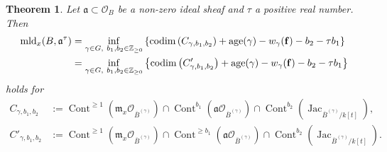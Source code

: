 \documentclass[a4paper,11pt]{amsart}
\newtheorem{thm}{Theorem}[section]
\theoremstyle{definition}
\theoremstyle{remark}
\begin{document}
\begin{thm}\label{thm:mld_hyperquot}
Let $\mathfrak{a} \subset  \mathcal{O}_B$ be a non-zero ideal sheaf and $\tau$ a positive real number. 
Then 
\begin{align*}
\operatorname{mld}_x(B,\mathfrak{a}^{\tau}) 
&= \inf _{\gamma \in G, \ b_1, b_2 \in \mathbb{Z}_{\ge 0}}
\left \{ 
\operatorname{codim} \left( C_{\gamma, b_1, b_2} \right) + \operatorname{age}(\gamma)- w_\gamma({\bf f}) - b_2 - \tau b_1
\right \} \\
&= \inf _{\gamma \in G, \ b_1, b_2 \in \mathbb{Z}_{\ge 0}}
\left \{ 
\operatorname{codim} \left( C' _{\gamma, b_1, b_2} \right) + \operatorname{age}(\gamma) - w_\gamma({\bf f}) - b_2 - \tau b_1
\right \}
\end{align*}
holds for 
\begin{align*}
C_{\gamma, b_1, b_2} 
& := 
\operatorname{Cont}^{\ge 1} \left( \mathfrak{m}_x \mathcal{O}_{\overline{B}^{(\gamma)}} \right) \cap
\operatorname{Cont}^{b_1}  \left( \mathfrak{a} \mathcal{O}_{\overline{B}^{(\gamma)}} \right) \cap  
\operatorname{Cont}^{b_2} \left(\operatorname{Jac}_{\overline{B}^{(\gamma)}/k[t]} \right), \\
C'_{\gamma, b_1, b_2}
& := 
\operatorname{Cont}^{\ge 1} \left(\mathfrak{m}_x \mathcal{O}_{\overline{B}^{(\gamma)}} \right) \cap
\operatorname{Cont}^{\ge b_1}  \left(\mathfrak{a} \mathcal{O}_{\overline{B}^{(\gamma)}} \right) \cap 
\operatorname{Cont}^{b_2} \left(\operatorname{Jac}_{\overline{B}^{(\gamma)}/k[t]} \right). 
\end{align*} 
\end{thm}
\end{document}
